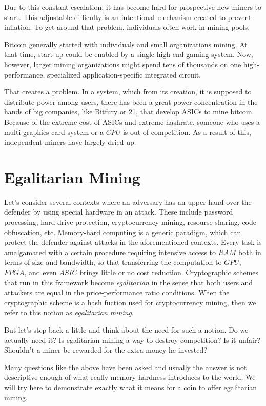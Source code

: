 Due to this constant escalation, it has become hard for prospective new miners to start. This adjustable difficulty is an intentional mechanism created to prevent inflation. To get around that problem, individuals often work in mining pools.

Bitcoin generally started with individuals and small organizations mining. At that time, start-up could be enabled by a single high-end gaming system. Now, however, larger mining organizations might spend tens of thousands on one high-performance, specialized application-specific integrated circuit.

That creates a problem. In a system, which from its creation, it is supposed to distribute power among users, there has been a great power concentration in the hands of big companies, like Bitfury or 21, that develop ASICs to mine bitcoin. Because of the extreme cost of ASICs and extreme hashrate, someone who uses a multi-graphics card system or a $CPU$ is out of competition. As a result of this, independent miners have largely dried up.

%
\section{Egalitarian Mining}
Let's consider several contexts where an adversary has an upper hand over the defender by using special hardware in an attack. These include password processing, hard-drive protection, cryptocurrency mining, resourse sharing, code obfuscation, etc. Memory-hard computing is a generic paradigm, which can protect the defender against attacks in the aforementioned contexts. Every task is amalgamated with a certain procedure requiring intensive access to $RAM$ both in terms of size and bandwidth, so that transferring the computation to $GPU$, $FPGA$, and even $ASIC$ brings little or no cost reduction. Cryptographic schemes that run in this framework become \emph{egalitarian} in the sense that both users and attackers are equal in the price-performance ratio conditions. When the cryptographic scheme is a hash fuction used for cryptocurrency mining, then we refer to this notion as \emph{egalitarian mining}.

But let's step back a little and think about the need for such a notion. Do we actually need it? Is egalitarian mining a way to destroy competition? Is it unfair? Shouldn't a miner be rewarded for the extra money he invested?

Many questions like the above have been asked and usually the answer is not descriptive enough of what really memory-hardness introduces to the world. We will try here to demonstrate exactly what it means for a coin to offer egalitarian mining.

